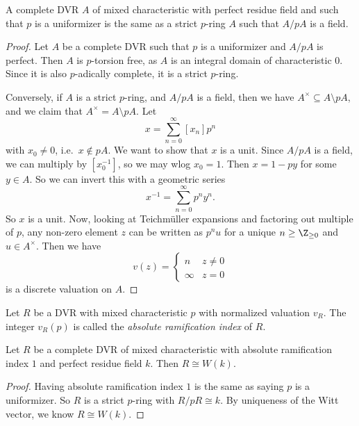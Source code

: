 \documentclass[a4paper]{article}
\begin{document}
\begin{prop}
  A complete DVR $A$ of mixed characteristic with perfect residue field and such that $p$ is a uniformizer is the same as a strict $p$-ring $A$ such that $A/pA$ is a field.
\end{prop}

\begin{proof}
  Let $A$ be a complete DVR such that $p$ is a uniformizer and $A/pA$ is perfect. Then $A$ is $p$-torsion free, as $A$ is an integral domain of characteristic $0$. Since it is also $p$-adically complete, it is a strict $p$-ring.

  Conversely, if $A$ is a strict $p$-ring, and $A/pA$ is a field, then we have $A^\times \subseteq A \setminus pA$, and we claim that $A^\times = A \setminus pA$. Let
  \[
    x = \sum_{n = 0}^\infty [x_n] p^n
  \]
  with $x_0 \not= 0$, i.e.\ $x \not\in pA$. We want to show that $x$ is a unit. Since $A/pA$ is a field, we can multiply by $[x_0^{-1}]$, so we may wlog $x_0 = 1$. Then $x = 1 - py$ for some $y \in A$. So we can invert this with a geometric series
  \[
    x^{-1} = \sum_{n = 0}^\infty p^n y^n.
  \]
  So $x$ is a unit. Now, looking at Teichm\"uller expansions and factoring out multiple of $p$, any non-zero element $z$ can be written as $p^n u$ for a unique $n \geq \Z_{\geq 0}$ and $u \in A^\times$. Then we have
  \[
    v(z) =
    \begin{cases}
      n & z \not= 0\\
      \infty & z = 0
    \end{cases}
  \]
  is a discrete valuation on $A$.
\end{proof}

\begin{defi}
  Let $R$ be a DVR with mixed characteristic $p$ with normalized valuation $v_R$. The integer $v_R(p)$ is called the \emph{absolute ramification index} of $R$.
\end{defi}

\begin{cor}
  Let $R$ be a complete DVR of mixed characteristic with absolute ramification index $1$ and perfect residue field $k$. Then $R \cong W(k)$.
\end{cor}

\begin{proof}
  Having absolute ramification index $1$ is the same as saying $p$ is a uniformizer. So $R$ is a strict $p$-ring with $R/pR \cong k$. By uniqueness of the Witt vector, we know $R \cong W(k)$.
\end{proof}
\end{document}
